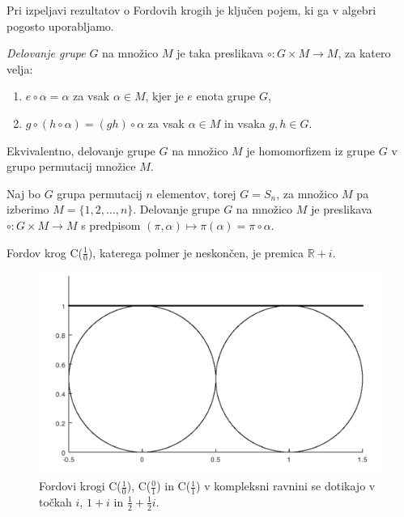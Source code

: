 \documentclass[mat1]{fmfdelo}
\begin{document}
Pri izpeljavi rezultatov o Fordovih krogih je ključen pojem, ki ga v algebri pogosto uporabljamo.

\begin{definicija}
\emph{Delovanje grupe} $G$ na množico $M$ je taka preslikava \( \circ \colon G \times M \rightarrow M \), za katero velja:
\begin{enumerate}
	\item \( e \circ \alpha = \alpha \) za vsak $ \alpha \in M$, kjer je $e$ enota grupe $G$, 
	\item \( g \circ (h \circ \alpha) = (gh) \circ \alpha \) za vsak $\alpha \in M$ in vsaka $g,h \in G$.
\end{enumerate}

Ekvivalentno, delovanje grupe $G$ na množico $M$ je homomorfizem iz grupe $G$ v grupo permutacij množice $M$.
\end{definicija}

\begin{primer}
Naj bo $G$ grupa permutacij $n$ elementov, torej $G = S_{n}$, za množico $M$ pa izberimo $M = \{1,2, \ldots, n \}$.
Delovanje grupe $G$ na množico $M$ je preslikava \( \circ \colon G \times M \rightarrow M \) s predpisom \( (\pi, \alpha) \mapsto \pi(\alpha) = \pi \circ \alpha \).
\end{primer}

\begin{definicija}
Fordov krog C($\frac{1}{0}$), katerega polmer je neskončen, je premica $\mathbb{R} + i$.
\end{definicija}

\begin{figure}[h!]
\begin{center}
\includegraphics[scale=0.58]{fordovi_v_kompleksnem.png}
\caption{Fordovi krogi C($\frac{1}{0}$), C($\frac{0}{1}$) in C($\frac{1}{1}$) v kompleksni ravnini se dotikajo v točkah $i$, $1+i$ in $\frac{1}{2}+\frac{1}{2} i$.}
\end{center}
\end{figure}
\end{document}
